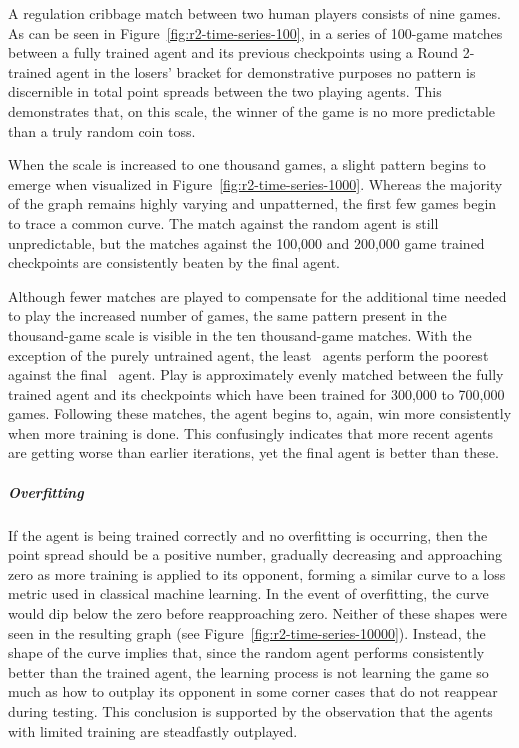 A regulation cribbage match between two human players consists of nine games.
%
As can be seen in Figure~\ref{fig:r2-time-series-100},
in a series of 100-game matches between a fully trained agent and its
previous checkpoints\textemdash
using a Round 2-trained agent in the losers' bracket for demonstrative
purposes\textemdash
no pattern is discernible in total point spreads between the two playing agents.
%
This demonstrates that,
on this scale,
the winner of the game is no more predictable than a truly random coin toss.

When the scale is increased to one thousand games,
a slight pattern begins to emerge
when visualized in Figure~\ref{fig:r2-time-series-1000}.
%
Whereas the majority of the graph remains highly varying and unpatterned,
the first few games begin to trace a common curve.
%
The match against the random agent is still unpredictable,
but the matches against the 100,000 and 200,000 game trained checkpoints are
consistently beaten by the final agent.

Although fewer matches are played to compensate for the additional time needed to
play the increased number of games,
the same pattern present in the thousand-game scale is visible in the
ten thousand-game matches.
%
With the exception of the purely untrained agent,
the least \learned\ agents perform the poorest against the final
\learned\ agent.
%
Play is approximately evenly matched between the fully trained agent
and its checkpoints which have been trained for 300,000 to 700,000 games.
%
Following these matches,
the agent begins to, again, win more consistently when more training is done.
%
This confusingly indicates that more recent agents are getting worse
than earlier iterations,
yet the final agent is better than these.

\subparagraph*{Overfitting}

If the agent is being trained correctly and no overfitting is occurring,
then the point spread should be a positive number,
gradually decreasing and approaching zero
as more training is applied to its opponent,
forming a similar curve to a loss metric used in classical machine learning.
%
In the event of overfitting,
the curve would dip below the zero before reapproaching zero.
%
Neither of these shapes were seen in the resulting graph
(see Figure~\ref{fig:r2-time-series-10000}).
%
Instead,
the shape of the curve implies that,
since the random agent performs consistently better than the trained agent,
the learning process is not learning the game so much as how to outplay its
opponent in some corner cases that do not reappear during testing.
%
This conclusion is supported by the observation that the agents with limited
training are steadfastly outplayed.

